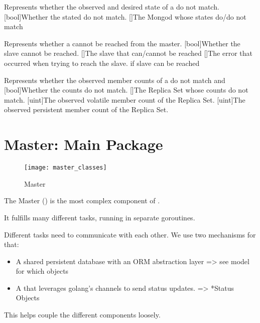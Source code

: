 {
  Represents whether the observed and desired state of a  do not match.
}{
  [bool]{Whether the stated do not match.}
  []{The Mongod whose states do/do not match}
}

{
  Represents whether a  cannot be reached from the master.
}{
  [bool]{Whether the slave cannot be reached.}
  []{The slave that can/cannot be reached}
  []{The error that occurred when trying to reach the slave.  if slave can be reached}
}

{
  Represents whether the observed member counts of a  do not match  and 
}{
  [bool]{Whether the counts do not match.}
  []{The Replica Set whose counts do not match.}
  [uint]{The observed volatile member count of the Replica Set.}
  [uint]{The observed persistent member count of the Replica Set.}
}


\section{Master: Main Package}

\begin{figure}[H]
	\texttt{[image: master\_classes]}
	\caption{Master}
\end{figure}

The Master () is the most complex component of \mamid.

It fulfills many different tasks, running in separate goroutines.

Different tasks need to communicate with each other. We use two mechanisms for that:
\begin{itemize}
	\item A shared persistent database with an ORM abstraction layer => see model for which objects
	\item A  that leverages golang's channels to send status updates. => *Status Objects %
\end{itemize}
This helps couple the different components loosely.

